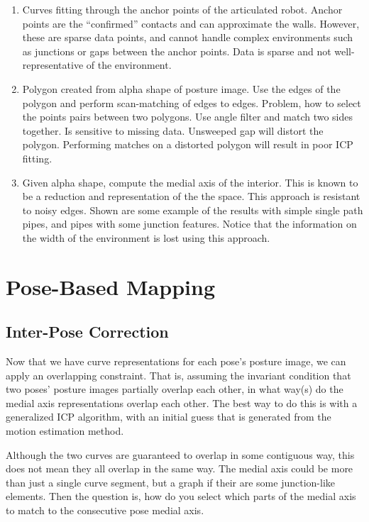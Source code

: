 \begin{enumerate}
\item Curves fitting through the anchor points of the articulated robot. Anchor points are the “confirmed” contacts and can approximate the walls. However, these are sparse data points, and cannot handle complex environments such as junctions or gaps between the anchor points. Data is sparse and not well-representative of the environment.

\item Polygon created from alpha shape of posture image. Use the edges of the polygon and perform scan-matching of edges to edges. Problem, how to select the points pairs between two polygons. Use angle filter and match two sides together. Is sensitive to missing data. Unsweeped gap will distort the polygon. Performing matches on a distorted polygon will result in poor ICP fitting.

\item Given alpha shape, compute the medial axis of the interior. This is known to be a reduction and representation of the the space. This approach is resistant to noisy edges. Shown are some example of the results with simple single path pipes, and pipes with some junction features. Notice that the information on the width of the environment is lost using this approach. 

\end{enumerate}

\pagebreak 

\chapter{Pose-Based Mapping}
\label{pose-basedmapping}

\section{Inter-Pose Correction}
\label{inter-posecorrection}

Now that we have curve representations for each pose’s posture image, we can apply an overlapping constraint. That is, assuming the invariant condition that two poses’ posture images partially overlap each other, in what way(s) do the medial axis representations overlap each other. The best way to do this is with a generalized ICP algorithm, with an initial guess that is generated from the motion estimation method.

Although the two curves are guaranteed to overlap in some contiguous way, this does not mean they all overlap in the same way. The medial axis could be more than just a single curve segment, but a graph if their are some junction-like elements. Then the question is, how do you select which parts of the medial axis to match to the consecutive pose medial axis.

